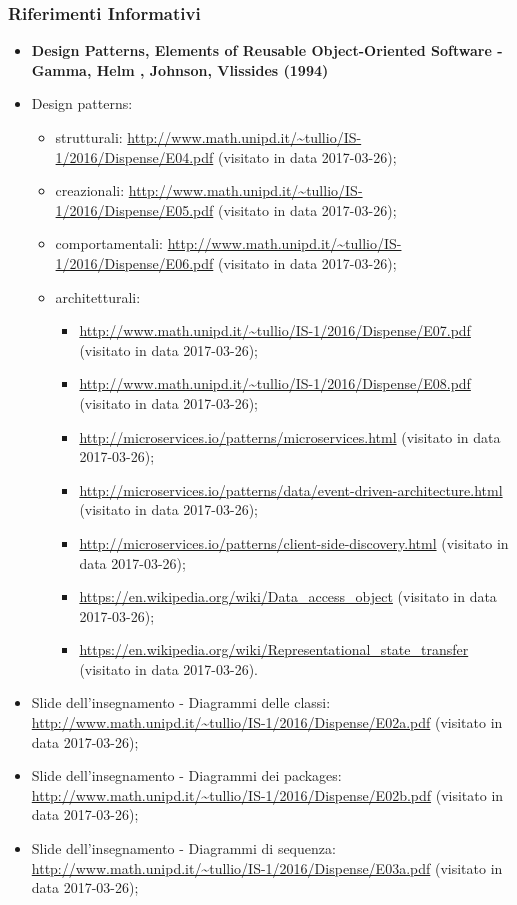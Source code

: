 	 \subsubsection{Riferimenti Informativi}
	  \begin{itemize}
		\item \textbf{Design Patterns, Elements of Reusable Object-Oriented Software - Gamma, Helm , Johnson, Vlissides (1994)}
	    \item Design patterns:
	      \begin{itemize}
	       \item strutturali:
	       \url{http://www.math.unipd.it/~tullio/IS-1/2016/Dispense/E04.pdf} (visitato in data 2017-03-26);
	       \item creazionali:
	       \url{http://www.math.unipd.it/~tullio/IS-1/2016/Dispense/E05.pdf} (visitato in data 2017-03-26);
	       \item comportamentali:
	       \url{http://www.math.unipd.it/~tullio/IS-1/2016/Dispense/E06.pdf} (visitato in data 2017-03-26);
	       \item architetturali:
	       \begin{itemize}
				 \item \url{http://www.math.unipd.it/~tullio/IS-1/2016/Dispense/E07.pdf} (visitato in data 2017-03-26);
	       \item \url{http://www.math.unipd.it/~tullio/IS-1/2016/Dispense/E08.pdf} (visitato in data 2017-03-26);
	       \item \url{http://microservices.io/patterns/microservices.html} (visitato in data 2017-03-26);
	       \item \url{http://microservices.io/patterns/data/event-driven-architecture.html} (visitato in data 2017-03-26);
	       \item \url{http://microservices.io/patterns/client-side-discovery.html} (visitato in data 2017-03-26);
	       \item \url{https://en.wikipedia.org/wiki/Data_access_object} (visitato in data 2017-03-26);
	       \item \url{https://en.wikipedia.org/wiki/Representational_state_transfer} (visitato in data 2017-03-26).
	       \end{itemize}
	      \end{itemize}
	    \item Slide dell’insegnamento - Diagrammi delle classi:
	    \url{http://www.math.unipd.it/~tullio/IS-1/2016/Dispense/E02a.pdf} (visitato in data 2017-03-26);
	    \item Slide dell’insegnamento - Diagrammi dei packages:
	    \url{http://www.math.unipd.it/~tullio/IS-1/2016/Dispense/E02b.pdf} (visitato in data 2017-03-26);
	    \item Slide dell’insegnamento - Diagrammi di sequenza:
	    \url{http://www.math.unipd.it/~tullio/IS-1/2016/Dispense/E03a.pdf} (visitato in data 2017-03-26);
	  \end{itemize}
